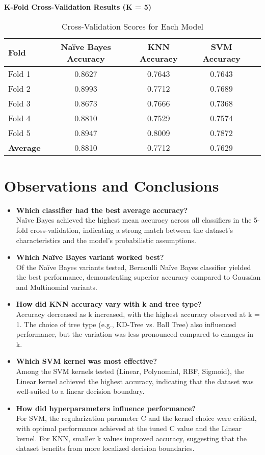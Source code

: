 \documentclass[11pt]{article}
\begin{document}
\vspace{1cm}
\noindent
\textbf{K-Fold Cross-Validation Results (K = 5)} \\
\begin{table}[h!]
\centering
\begin{tabular}{|l|c|c|c|c|}
\hline
\textbf{Fold} & \textbf{Naïve Bayes Accuracy} & \textbf{KNN Accuracy} & \textbf{SVM Accuracy}\\
\hline
Fold 1 & 0.8627 & 0.7643 & 0.7643\\
Fold 2 & 0.8993 & 0.7712 & 0.7689\\
Fold 3 & 0.8673 & 0.7666 & 0.7368\\
Fold 4 & 0.8810 & 0.7529 & 0.7574\\
Fold 5 & 0.8947 & 0.8009 & 0.7872\\
\hline
\textbf{Average} & 0.8810 & 0.7712 & 0.7629\\
\hline
\end{tabular}
\caption{Cross-Validation Scores for Each Model}
\end{table}

\vspace{1cm}
\section{Observations and Conclusions}
\begin{itemize}
    \item \textbf{Which classifier had the best average accuracy?}
    \\Naïve Bayes achieved the highest mean accuracy across all classifiers in the 5-fold cross-validation, indicating a strong match between the dataset’s characteristics and the model’s probabilistic assumptions.
    \item \textbf{Which Naïve Bayes variant worked best?}
    \\Of the Naïve Bayes variants tested, Bernoulli Naïve Bayes classifier yielded the best performance, demonstrating superior accuracy compared to Gaussian and Multinomial variants.
    \item \textbf{How did KNN accuracy vary with k and tree type?}
    \\Accuracy decreased as k increased, with the highest accuracy observed at k = 1. The choice of tree type (e.g., KD-Tree vs. Ball Tree) also influenced performance, but the variation was less pronounced compared to changes in k.
    \item \textbf{Which SVM kernel was most effective?}
    \\Among the SVM kernels tested (Linear, Polynomial, RBF, Sigmoid), the Linear kernel achieved the highest accuracy, indicating that the dataset was well-suited to a linear decision boundary.
    \item \textbf{How did hyperparameters influence performance?}
    \\For SVM, the regularization parameter C and the kernel choice were critical, with optimal performance achieved at the tuned C value and the Linear kernel. For KNN, smaller k values improved accuracy, suggesting that the dataset benefits from more localized decision boundaries. 
\end{itemize}
\end{document}
